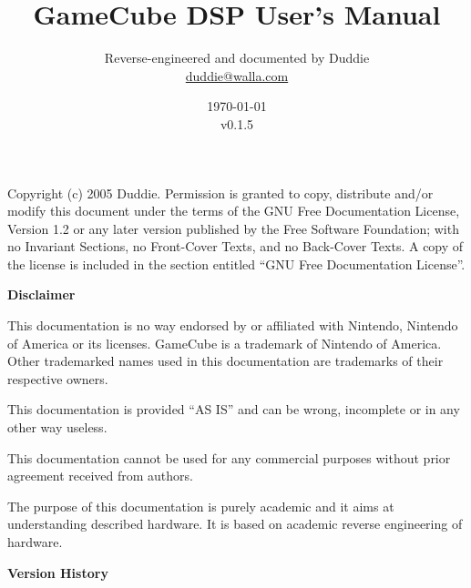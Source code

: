\documentclass[oneside,english,a4paper,10pt,oneside,openany,final]{memoir}
\title{\textbf{\Huge GameCube DSP User's Manual}}
\author{Reverse-engineered and documented by Duddie \\ \href{mailto:duddie@walla.com}{duddie@walla.com}}
\date{\today\\v0.1.5}
\begin{document}
\maketitle{}

\pagebreak{}
\vspace*{\fill}

Copyright (c) 2005 Duddie. Permission is granted to copy, distribute and/or modify this document under the terms of the GNU Free Documentation License, Version 1.2 or any later version published by the Free Software Foundation; with no Invariant Sections, no Front-Cover Texts, and no Back-Cover Texts. A copy of the license is included in the section entitled ``GNU Free Documentation License''.

\pagebreak{}
\tableofcontents{}
\pagebreak{}

\textbf{\LARGE Disclaimer}
\vspace{5mm}

This documentation is no way endorsed by or affiliated with Nintendo, Nintendo of America or its licenses. GameCube is a trademark of Nintendo of America. Other trademarked names used in this documentation are trademarks of their respective owners.

This documentation is provided ``AS IS'' and can be wrong, incomplete or in any other way useless.

This documentation cannot be used for any commercial purposes without prior agreement received from authors.

The purpose of this documentation is purely academic and it aims at understanding described hardware. It is based on academic reverse engineering of hardware.

\pagebreak{}
\textbf{\LARGE Version History}
\vspace{5mm}
\end{document}
